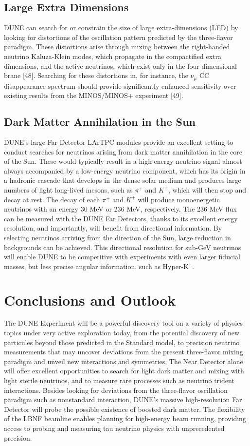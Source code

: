 \subsection{Large Extra Dimensions}
DUNE can search for or constrain the size of large extra-dimensions (LED) by looking for distortions of the oscillation pattern predicted by the three-flavor paradigm. These distortions arise through mixing between the right-handed neutrino Kaluza-Klein modes, which propagate in the compactified extra dimensions, and the active neutrinos, which exist only in the four-dimensional brane [48]. Searching for these distortions in, for instance, the $\nu_{\mu}$ CC disappearance spectrum should provide significantly enhanced sensitivity over existing results from the MINOS/MINOS+ experiment [49].

\subsection{Dark Matter Annihilation in the Sun}
DUNE's large Far Detector LArTPC modules provide an excellent setting to conduct searches for neutrinos arising from dark matter annihilation in the core of the Sun. These would typically result in a high-energy neutrino signal almost always accompanied by a low-energy neutrino component, which has its origin in a hadronic cascade that
develops in the dense solar medium and produces large numbers of light long-lived mesons, such as $\pi^+$ and $K^+$, which will then stop and decay at rest. The decay of each $\pi^+$ and $K^+$ will
produce monoenergetic neutrinos with an energy 30 MeV or 236 MeV, respectively.
The 236 MeV flux can be measured with the DUNE Far Detectors, thanks to its excellent energy resolution, and importantly, will benefit from directional information. By selecting neutrinos arriving from the direction of the Sun, large reduction in backgrounds can be achieved.
This directional resolution for sub-GeV neutrinos will enable DUNE to be competitive with experiments with even larger fiducial masses, but less precise angular information, such as Hyper-K~\cite{ref:DMannihilation}.

\section{Conclusions and Outlook}
The DUNE Experiment will be a powerful discovery tool on a variety of physics topics under very active exploration today, from the potential discovery of new particules beyond those predicted in the Standard model, to precision neutrino measurements that may uncover deviations from the present three-flavor mixing paradigm and unveil new interactions and symmetries.
The Near Detector alone will offer excellent opportunities to search for light dark matter and mixing with light sterile neutrinos, and to measure rare processes such as neutrino trident interactions. Besides looking for deviations from the three-flavor oscillation paradigm such as nonstandard interaction, DUNE's massive high-resolution Far Detector will probe  the possible existence of boosted dark matter. The flexibility of the LBNF beamline enables planning for high-energy beam running, providing access to probing and measuring tau neutrino physics with unprecedented precision.

